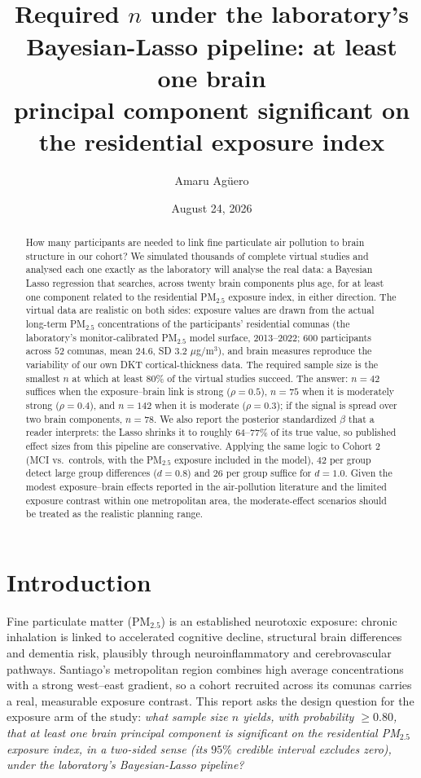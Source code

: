 \documentclass[11pt,a4paper]{article}
\title{\vspace{-1.2em}{\color{NavyInk}\bfseries\LARGE Bayesian Sample Size Determination for\\[2pt]
Residential \pmf{} Exposure and Brain Structure}\\[6pt]
{\large\color{SoftGrey} Required $n$ under the laboratory's Bayesian-Lasso pipeline: at least one brain\\ principal component significant on the residential \pmf{} exposure index}}
\author{Amaru Ag\"uero}
\date{August 24, 2026}
\newcommand{\pmf}{PM$_{2.5}$}
\newcommand{\ugm}{$\mu$g/m$^{3}$}
\begin{document}
\maketitle
\vspace{-1.4em}

\begin{abstract}
\noindent How many participants are needed to link fine particulate air pollution to brain structure in our cohort? We simulated thousands of complete virtual studies and analysed each one exactly as the laboratory will analyse the real data: a Bayesian Lasso regression that searches, across twenty brain components plus age, for at least one component related to the residential \pmf{} exposure index, in either direction. The virtual data are realistic on both sides: exposure values are drawn from the actual long-term \pmf{} concentrations of the participants' residential comunas (the laboratory's monitor-calibrated \pmf{} model surface, 2013--2022; $600$ participants across $52$ comunas, mean $24.6$, SD $3.2$ \ugm), and brain measures reproduce the variability of our own DKT cortical-thickness data. The required sample size is the smallest $n$ at which at least $80\%$ of the virtual studies succeed. The answer: $n=42$ suffices when the exposure--brain link is strong ($\rho=0.5$), $n=75$ when it is moderately strong ($\rho=0.4$), and $n=142$ when it is moderate ($\rho=0.3$); if the signal is spread over two brain components, $n=78$. We also report the posterior standardized $\beta$ that a reader interprets: the Lasso shrinks it to roughly $64$--$77\%$ of its true value, so published effect sizes from this pipeline are conservative. Applying the same logic to Cohort 2 (MCI vs.\ controls, with the \pmf{} exposure included in the model), $42$ per group detect large group differences ($d=0.8$) and $26$ per group suffice for $d=1.0$. Given the modest exposure--brain effects reported in the air-pollution literature and the limited exposure contrast within one metropolitan area, the moderate-effect scenarios should be treated as the realistic planning range.
\end{abstract}

\section{Introduction}

Fine particulate matter (\pmf) is an established neurotoxic exposure: chronic inhalation is linked to accelerated cognitive decline, structural brain differences and dementia risk, plausibly through neuroinflammatory and cerebrovascular pathways. Santiago's metropolitan region combines high average concentrations with a strong west--east gradient, so a cohort recruited across its comunas carries a real, measurable exposure contrast. This report asks the design question for the exposure arm of the study: \emph{what sample size $n$ yields, with probability $\ge0.80$, that at least one brain principal component is significant on the residential \pmf{} exposure index, in a two-sided sense (its $95\%$ credible interval excludes zero), under the laboratory's Bayesian-Lasso pipeline?}
\end{document}
